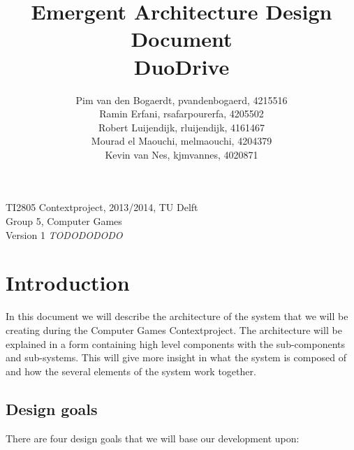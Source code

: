 \documentclass[11pt,twoside,a4paper]{article}
\title{
  Emergent Architecture Design Document\\
  DuoDrive
}
\author{
	Pim van den Bogaerdt, pvandenbogaerd, 4215516\\
	Ramin Erfani, rsafarpourerfa, 4205502\\
	Robert Luijendijk, rluijendijk, 4161467\\
	Mourad el Maouchi, melmaouchi, 4204379\\
	Kevin van Nes, kjmvannes, 4020871
}
\begin{document}
\maketitle
\begin{center}
TI2805 Contextproject, 2013/2014, TU Delft\\
Group 5, Computer Games\\
Version 1 \emph{TODODODODO}
\end{center}
\clearpage


\section{Introduction}
In this document we will describe the architecture of the system that we will be creating during the Computer Games Contextproject. The architecture will be explained in a form containing high level components with the sub-components and sub-systems. This will give more insight in what the system is composed of and how the several elements of the system work together. 


\subsection{Design goals}
There are four design goals that we will base our development upon:
\end{document}
